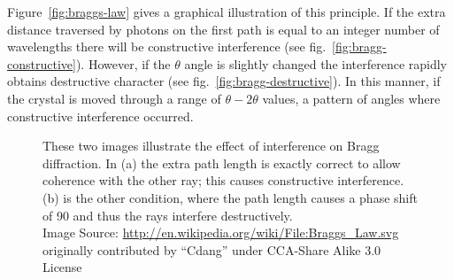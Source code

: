 Figure~\vref{fig:braggs-law} gives a graphical illustration of this principle. If the extra distance traversed by photons on the first path is equal to an integer number of wavelengths there will be constructive interference (see fig.~\vref{fig:bragg-constructive}). However, if the $\theta$ angle is slightly changed the interference rapidly obtains destructive character (see fig.~\vref{fig:bragg-destructive}). In this manner, if the crystal is moved through a range of $\theta-2\theta$ values, a pattern of angles where constructive interference occurred. \cite{giacovazzo_XRD_1992}

\begin{figure}[tbp]
   \centering
	\hspace{0.5cm}
   \caption[Illustration of Bragg's Law]%
   		{These two images illustrate the effect of interference on Bragg diffraction. In (a) the extra %
		path length is exactly correct to allow coherence with the other ray; this causes constructive %
		interference. (b) is the other condition, where the path length causes a phase shift of 90\Deg{}%
		and thus the rays interfere destructively.\\%
		{\tiny Image Source: \url{http://en.wikipedia.org/wiki/File:Braggs_Law.svg} originally contributed by %
		``Cdang'' under CCA-Share Alike 3.0 License}}
   \label{fig:braggs-law}
\end{figure}

